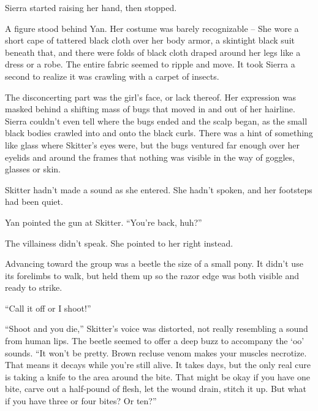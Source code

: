 Sierra started raising her hand, then stopped.



A figure stood behind Yan.  Her costume was barely recognizable – She wore a short cape of tattered black cloth over her body armor, a skintight black suit beneath that, and there were folds of black cloth draped around her legs like a dress or a robe.  The entire fabric seemed to ripple and move.  It took Sierra a second to realize it was crawling with a carpet of insects.



The disconcerting part was the girl's face, or lack thereof.  Her expression was masked behind a shifting mass of bugs that moved in and out of her hairline.  Sierra couldn't even tell where the bugs ended and the scalp began, as the small black bodies crawled into and onto the black curls.  There was a hint of something like glass where Skitter's eyes were, but the bugs ventured far enough over her eyelids and around the frames that nothing was visible in the way of goggles, glasses or skin.



Skitter hadn't made a sound as she entered.  She hadn't spoken, and her footsteps had been quiet.



Yan pointed the gun at Skitter.  ``You're back, huh?''



The villainess didn't speak.  She pointed to her right instead.



Advancing toward the group was a beetle the size of a small pony.  It didn't use its forelimbs to walk, but held them up so the razor edge was both visible and ready to strike.



``Call it off or I shoot!''



``Shoot and you die,'' Skitter's voice was distorted, not really resembling a sound from human lips.  The beetle seemed to offer a deep buzz to accompany the `oo' sounds.  ``It won't be pretty.  Brown recluse venom makes your muscles necrotize.  That means it decays while you're still alive.  It takes days, but the only real cure is taking a knife to the area around the bite.  That might be okay if you have one bite, carve out a half-pound of flesh, let the wound drain, stitch it up.  But what if you have three or four bites?  Or ten?''



